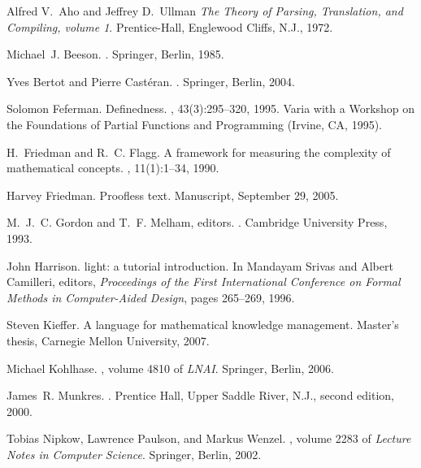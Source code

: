 \documentclass{llncs}
\begin{document}
\begin{thebibliography}{10}

 Alfred V.~Aho and Jeffrey D.~Ullman \newblock
  {\em The Theory of Parsing, Translation, and Compiling, volume 1}.
  \newblock Prentice-Hall, Englewood Cliffs, N.J., 1972.

Michael~J. Beeson.
.
\newblock Springer, Berlin, 1985.

Yves Bertot and Pierre Cast\'eran.
.
\newblock Springer, Berlin, 2004.

Solomon Feferman.
\newblock Definedness.
, 43(3):295--320, 1995.
\newblock Varia with a Workshop on the Foundations of Partial Functions and
  Programming (Irvine, CA, 1995).

H.~Friedman and R.~C. Flagg.
\newblock A framework for measuring the complexity of mathematical concepts.
, 11(1):1--34, 1990.

Harvey Friedman.
\newblock Proofless text.
\newblock Manuscript, September 29, 2005.

M.~J.~C. Gordon and T.~F. Melham, editors.
.
\newblock Cambridge University Press, 1993.

John Harrison.
 light: a tutorial introduction.
\newblock In Mandayam Srivas and Albert Camilleri, editors, {\em Proceedings of
  the First International Conference on Formal Methods in Computer-Aided
  Design}, pages 265--269, 1996.

Steven Kieffer.
\newblock A language for mathematical knowledge management.
\newblock Master's thesis, Carnegie Mellon University, 2007.

Michael Kohlhase.
, volume
  4810 of {\em LNAI}.
\newblock Springer, Berlin, 2006.

James~R. Munkres.
.
\newblock Prentice Hall, Upper Saddle River, N.J., second edition, 2000.

 Tobias Nipkow, Lawrence Paulson, and Markus
  Wenzel.  , volume 2283 of {\em Lecture Notes in Computer
    Science}.  \newblock Springer, Berlin, 2002.


\end{thebibliography}
\end{document}
